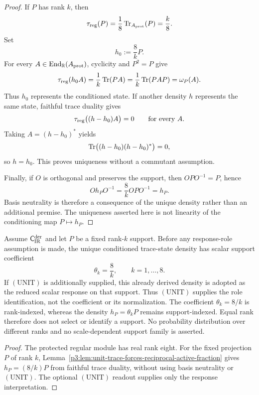 \documentclass[12pt,a4paper]{article}
\begin{document}
\begin{proof}
If \(P\) has rank \(k\), then
\[
 \tau_{\rm reg}(P)=\frac18\operatorname{Tr}_{A_{\rm prot}}(P)=\frac{k}{8}.
\]
Set
\[
 h_0:=\frac8kP.
\]
For every \(A\in\operatorname{End}_{\mathbb R}(A_{\rm prot})\), cyclicity and \(P^2=P\)
give
\[
 \tau_{\rm reg}(h_0A)
 =\frac1k\operatorname{Tr}(PA)
 =\frac1k\operatorname{Tr}(PAP)
 =\omega_P(A).
\]
Thus \(h_0\) represents the conditioned state.  If another density \(h\)
represents the same state, faithful trace duality gives
\[
 \tau_{\rm reg}\bigl((h-h_0)A\bigr)=0
 \qquad\text{for every }A.
\]
Taking \(A=(h-h_0)^*\) yields
\[
 \operatorname{Tr}\bigl((h-h_0)(h-h_0)^*\bigr)=0,
\]
so \(h=h_0\).  This proves uniqueness without a commutant assumption.

Finally, if \(O\) is orthogonal and preserves the support, then
\(OPO^{-1}=P\), hence
\[
 Oh_PO^{-1}=\frac8kOPO^{-1}=h_P.
\]
Basis neutrality is therefore a consequence of the unique density rather than
an additional premise.  The uniqueness asserted here is not linearity of the
conditioning map \(P\mapsto h_P\).
\end{proof}

\begin{corollary}
\label{p3:thm:eight-mode-harmonic-response}
Assume \(\mathsf C_{\rm IR}^{\rm der}\) and let \(P\) be a fixed
rank-\(k\) support.  Before any response-role assumption is made, the unique
conditioned trace-state density has scalar support coefficient
\begin{equation}
\label{p3:eq:eight-mode-harmonic-response}
 \boxed{\theta_k=\frac8k},
 \qquad k=1,\ldots,8.
\end{equation}
If \((\mathrm{UNIT})\) is additionally supplied, this already derived density
is adopted as the reduced scalar response on that support.  Thus
\((\mathrm{UNIT})\) supplies the role identification, not the coefficient or
its normalization.  The coefficient \(\theta_k=8/k\) is rank-indexed, whereas the density
\(h_P=\theta_kP\) remains support-indexed.  Equal rank therefore does not
select or identify a support.  No probability distribution over different
ranks and no scale-dependent support family is asserted.
\end{corollary}

\begin{proof}
The protected regular module has real rank eight.  For the fixed projection
\(P\) of rank \(k\),
Lemma~\ref{p3:lem:unit-trace-forces-reciprocal-active-fraction} gives
\(h_P=(8/k)P\) from faithful trace duality, without using basis neutrality or
\((\mathrm{UNIT})\).  The optional
\((\mathrm{UNIT})\) readout supplies only the response interpretation.
\end{proof}
\end{document}
